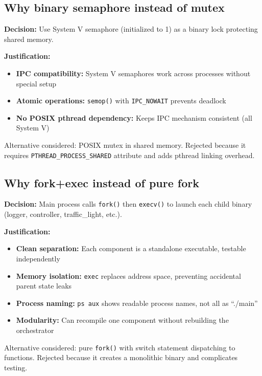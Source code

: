 \documentclass[11pt,a4paper]{article}
\begin{document}
\newpage
\subsection{Why binary semaphore instead of mutex}

\textbf{Decision:} Use System V semaphore (initialized to 1) as a binary lock protecting shared memory.

\textbf{Justification:}
\begin{itemize}[noitemsep]
    \item \textbf{IPC compatibility:} System V semaphores work across processes without special setup
    \item \textbf{Atomic operations:} \texttt{semop()} with \texttt{IPC\_NOWAIT} prevents deadlock
    \item \textbf{No POSIX pthread dependency:} Keeps IPC mechanism consistent (all System V)
\end{itemize}

Alternative considered: POSIX mutex in shared memory. Rejected because it requires \texttt{PTHREAD\_PROCESS\_SHARED} attribute and adds pthread linking overhead.

\subsection{Why fork+exec instead of pure fork}

\textbf{Decision:} Main process calls \texttt{fork()} then \texttt{execv()} to launch each child binary (logger, controller, traffic\_light, etc.).

\textbf{Justification:}
\begin{itemize}[noitemsep]
    \item \textbf{Clean separation:} Each component is a standalone executable, testable independently
    \item \textbf{Memory isolation:} \texttt{exec} replaces address space, preventing accidental parent state leaks
    \item \textbf{Process naming:} \texttt{ps aux} shows readable process names, not all as ``./main''
    \item \textbf{Modularity:} Can recompile one component without rebuilding the orchestrator
\end{itemize}

Alternative considered: pure \texttt{fork()} with switch statement dispatching to functions. Rejected because it creates a monolithic binary and complicates testing.
\end{document}
